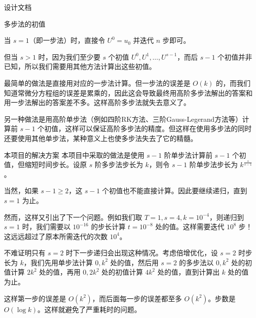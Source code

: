 \documentclass{beamer}
\begin{document}
\begin{frame}{设计文档}
\begin{figure}
	\end{figure}
\end{frame}


\begin{frame}{多步法的初值}

当 $s=1$（即一步法）时，直接令 $U^0=u_0$ 并迭代 $n$ 步即可。

但当 $s>1$ 时，因为我们至少要 $s$ 个初值 $U^0,U^1,\dots,U^{s-1}$，而后 $s-1$ 个初值并非已知，所以我们需要用其他方法计算出这些初值。

最简单的做法是直接用对应的一步法计算。但一步法的误差是 $O(k)$ 的，而我们知道常微分方程组的误差是累乘的，因此这会导致最终用高阶多步法解出的答案和用一步法解出的答案差不多。这样高阶多步法就失去意义了。

另一种做法是用高阶单步法（例如四阶RK方法、三阶Gauss-Legerand方法等）计算前 $s-1$ 个初值，这样可以保证高阶多步法的精度。但这样在使用多步法的同时还要使用其他单步法，某种意义上也使多步法失去了它的精髓。

\end{frame}

\begin{frame}{本项目的解决方案}
本项目中采取的做法是使用 $s-1$ 阶单步法计算前 $s-1$ 个初值，但缩短时间步长。设原 $s$ 阶多步法步长为 $k$，则令 $s-1$ 阶单步法步长为 $k^{\frac s{s-1}}$。

当然，如果 $s-1\geq 2$，这 $s-1$ 个初值也不能直接计算。因此要继续递归，直到 $s=1$ 为止。

然而，这样又引出了下一个问题。例如我们取 $T=1,s=4,k=10^{-4}$，则递归到 $s=1$ 时，我们需要以 $10^{-16}$ 的步长计算 $t=10^{-8}$ 处的值。这样需要迭代 $10^8$ 步！这远远超过了原本所需迭代的次数 $10^4$。

不难证明只有 $s=2$ 时下一步递归会出现这种情况。考虑倍增优化，设 $s=2$ 时步长为 $k$，我们先用单步法计算 $0,k^2$ 处的值，然后用 $s=2$ 的多步法以 $0,k^2$ 处的初值计算 $2k^2$ 处的值，再用 $0,2k^2$ 处的初值计算 $4k^2$ 处的值，直到计算出 $k$ 处的值为止。

这样第一步的误差是 $O(k^2)$，而后面每一步的误差都至多 $O(k^2)$。步数是 $O(\log k)$。这样就避免了严重耗时的问题。

\end{frame}
\end{document}
